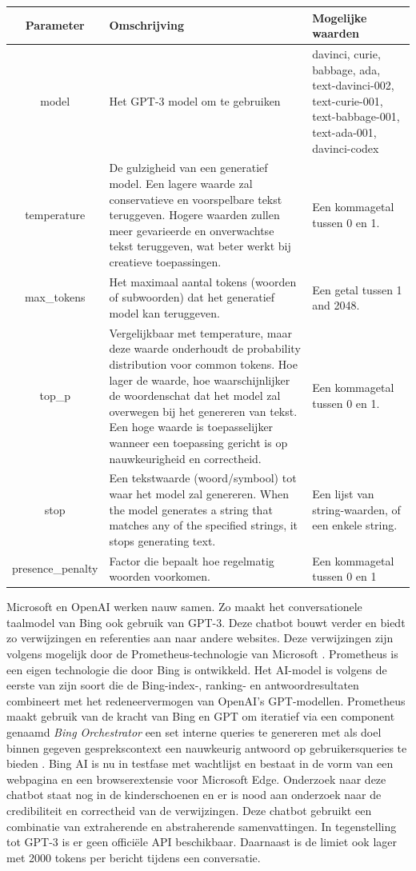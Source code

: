 \begin{tabular}{|c|p{7cm}|p{5cm}|}
	\hline
	Parameter & Omschrijving & Mogelijke waarden \\
	\hline
	model & Het GPT-3 model om te gebruiken & davinci, curie, babbage, ada, text-davinci-002, text-curie-001, text-babbage-001, text-ada-001, davinci-codex \\
	\hline
	temperature & De gulzigheid van een generatief model. Een lagere waarde zal conservatieve en voorspelbare tekst teruggeven. Hogere waarden zullen meer gevarieerde en onverwachtse tekst teruggeven, wat beter werkt bij creatieve toepassingen. & Een kommagetal tussen 0 en 1. \\
	\hline
	max\_tokens & Het maximaal aantal tokens (woorden of subwoorden) dat het generatief model kan teruggeven. & Een getal tussen 1 and 2048. \\
	\hline
	top\_p & Vergelijkbaar met temperature, maar deze waarde onderhoudt de probability distribution voor common tokens. Hoe lager de waarde, hoe waarschijnlijker de woordenschat dat het model zal overwegen bij het genereren van tekst. Een hoge waarde is toepasselijker wanneer een toepassing gericht is op nauwkeurigheid en correctheid. & Een kommagetal tussen 0 en 1. \\
	\hline
	stop & Een tekstwaarde (woord/symbool) tot waar het model zal genereren. When the model generates a string that matches any of the specified strings, it stops generating text. & Een lijst van string-waarden, of een enkele string. \\
	\hline
	presence\_penalty & Factor die bepaalt hoe regelmatig woorden voorkomen. & Een kommagetal tussen 0 en 1 \\
	\hline
\end{tabular}

\medspace

Microsoft en OpenAI werken nauw samen. Zo maakt het conversationele taalmodel van Bing ook gebruik van GPT-3. Deze chatbot bouwt verder en biedt zo verwijzingen en referenties aan naar andere websites. Deze verwijzingen zijn volgens mogelijk door de Prometheus-technologie van Microsoft \autocite{Ribas2023}. Prometheus is een eigen technologie die door Bing is ontwikkeld. Het AI-model is volgens \textcite{Ribas2023} de eerste van zijn soort die de Bing-index-, ranking- en antwoordresultaten combineert met het redeneervermogen van OpenAI’s GPT-modellen. Prometheus maakt gebruik van de kracht van Bing en GPT om iteratief via een component genaamd \textit{Bing Orchestrator} een set interne queries te genereren met als doel binnen gegeven gesprekscontext een nauwkeurig antwoord op gebruikersqueries te bieden \autocite{Ribas2023}. Bing AI is nu in testfase met wachtlijst en bestaat in de vorm van een webpagina en een browserextensie voor Microsoft Edge. Onderzoek naar deze chatbot staat nog in de kinderschoenen en er is nood aan onderzoek naar de credibiliteit en correctheid van de verwijzingen. Deze chatbot gebruikt een combinatie van extraherende en abstraherende samenvattingen. In tegenstelling tot GPT-3 is er geen officiële API beschikbaar. Daarnaast is de limiet ook lager met 2000 tokens per bericht tijdens een conversatie. 

